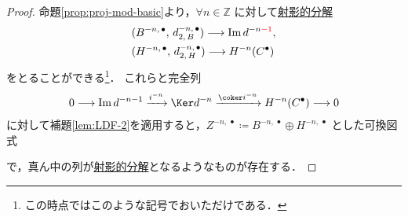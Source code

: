 \documentclass[algtopo_main]{subfiles}
\begin{document}
\begin{proof}
    命題\ref{prop:proj-mod-basic}より，$\forall n \in \mathbb{Z}$ に対して\hyperref[def:projective-resolution]{射影的分解}
    \begin{align}
        &(B^{-n,\, \bullet},\, d_{2,\, B}^{-n,\,\bullet}) \longrightarrow \Im d^{-n\textcolor{red}{-1}},\label{eq:CE-resol-1}\\
        &(H^{-n,\, \bullet},\, d_{2,\, H}^{-n,\,\bullet}) \longrightarrow H^{-n} (C^\bullet)\label{eq:CE-resol-2}
    \end{align}
    をとることができる\footnote{この時点ではこのような記号でおいただけである．}．
    これらと完全列
    \begin{align}
        0 \lto \Im d^{-n-1} \xrightarrow{i^{-n}} \Ker d^{-n} \xrightarrow{\coker i^{-n}} H^{-n}(C^\bullet) \lto 0
    \end{align}
    に対して補題\ref{lem:LDF-2}を適用すると，$Z^{-n,\, \bullet} \coloneqq B^{-n,\, \bullet} \oplus H^{-n,\, \bullet}$ とした可換図式
    \begin{center}
    \end{center}
    で，真ん中の列が\hyperref[def:projective-resolution]{射影的分解}となるようなものが存在する．


\end{proof}
\end{document}
